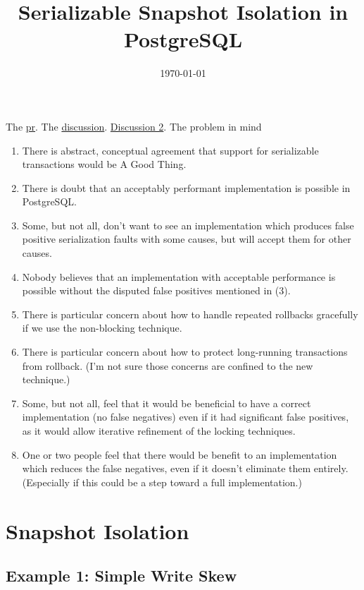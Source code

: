 \documentclass[11pt]{article}
\date{\today}
\title{Serializable Snapshot Isolation in PostgreSQL}
\begin{document}
\maketitle
The \href{https://github.com/postgres/postgres/commit/dafaa3efb75ce1aae2e6dbefaf6f3a889dea0d21}{pr}. The \href{https://www.postgresql.org/message-id/flat/4A0019EE.EE98.0025.0\%40wicourts.gov}{discussion}. \href{https://www.postgresql.org/message-id/flat/4A1D5D8C.EE98.0025.1\%40wicourts.gov}{Discussion 2}.
The problem in mind
\begin{enumerate}
\item There is abstract, conceptual agreement that support for serializable transactions would be A Good
Thing.
\item There is doubt that an acceptably performant implementation is possible in PostgreSQL.
\item Some, but not all, don't want to see an implementation which produces false positive serialization
faults with some causes, but will accept them for other causes.
\item Nobody believes that an implementation with acceptable performance is possible without the disputed
false positives mentioned in (3).
\item There is particular concern about how to handle repeated rollbacks gracefully if we use the non-blocking technique.
\item There is particular concern about how to protect long-running transactions from rollback.  (I'm not
sure those concerns are confined to the new technique.)
\item Some, but not all, feel that it would be beneficial to have a correct implementation (no false
negatives) even if it had significant false positives, as it would allow iterative refinement of
the locking techniques.
\item One or two people feel that there would be benefit to an implementation which reduces the false
negatives, even if it doesn't eliminate them entirely.  (Especially if this could be a step toward
a full implementation.)
\end{enumerate}
\section{Snapshot Isolation}
\label{sec:org47d8c59}

\subsection{Example 1: Simple Write Skew}
\label{sec:org3f7d755}
\end{document}

